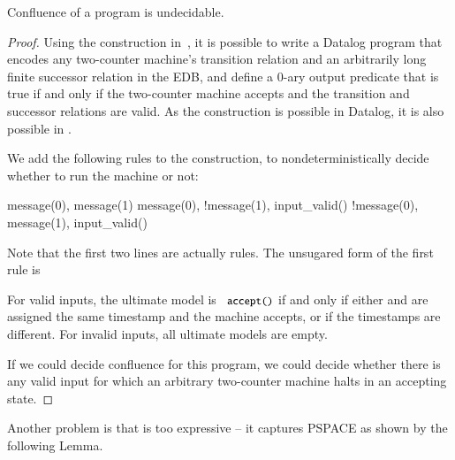 \begin{lemma}
\label{lem:confluence-undecidable}
Confluence of a \lang program is undecidable.
\end{lemma}
\begin{proof}
Using the construction in~\cite{undecidable-datalog}, it is possible to write a Datalog program that encodes any two-counter machine's transition relation and an arbitrarily long finite successor relation in the EDB, and define a 0-ary output predicate  that is true if and only if the two-counter machine accepts and the transition and successor relations are valid.  As the construction is possible in Datalog, it is also possible in \lang.

We add the following rules to the construction, to nondeterministically decide whether to run the machine or not:

\begin{Drules}
        {message(0), message(1)}
        {message(0), !message(1), input_valid()}
        {!message(0), message(1), input_valid()}
\end{Drules}

Note that the first two lines are actually rules.  The unsugared form of the first rule is 

For valid inputs, the ultimate model is ${\dedalus{accept()}}$ if and only if either  and  are assigned the same timestamp and the machine accepts, or if the timestamps are different.  For invalid inputs, all ultimate models are empty.

If we could decide confluence for this program, we could decide whether there is any valid input for which an arbitrary two-counter machine halts in an accepting state.
\end{proof}


Another problem is that \lang is too expressive -- it captures PSPACE as shown by the following Lemma.

